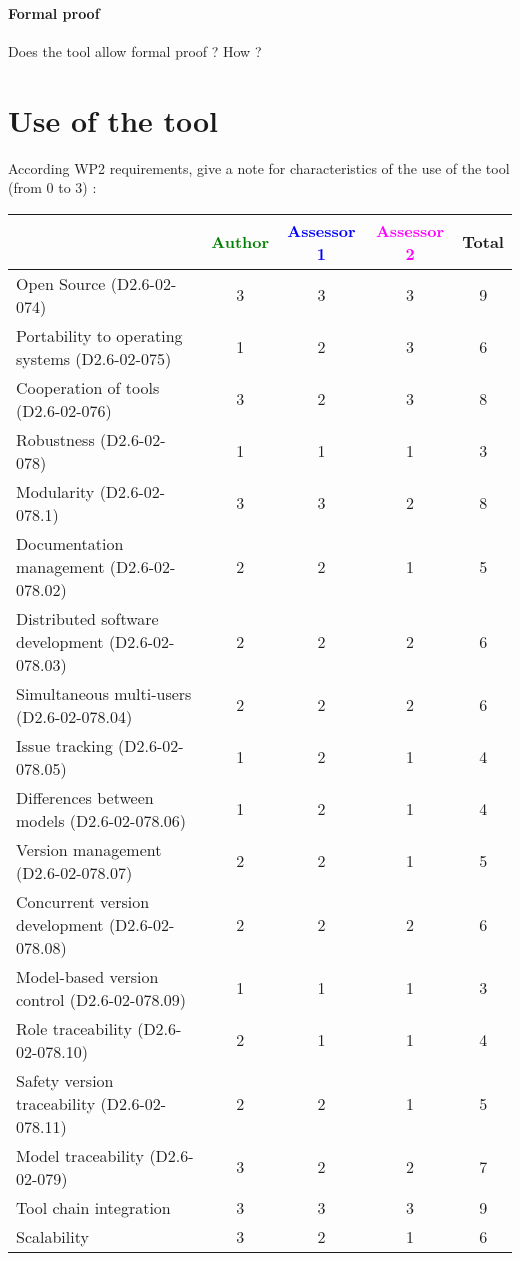 \paragraph{Formal proof}
Does the tool allow formal proof ? How ?

\section{Use of the tool}

According WP2 requirements, give a note for characteristics of the use of the tool (from 0 to 3) :

\begin{tabular}{|l | c | c | c | c|}
\hline
& \textcolor{green}{Author} & \textcolor{blue}{Assessor 1} & \textcolor{magenta}{Assessor 2} & Total \\
\hline
Open Source (D2.6-02-074) & 3 & 3 & 3 & 9 \\
\hline
Portability to operating systems (D2.6-02-075) & 1 & 2 &  3 & 6 \\
\hline
Cooperation of tools (D2.6-02-076) & 3 & 2 & 3 & 8 \\
\hline
Robustness (D2.6-02-078) & 1 & 1 & 1 & 3 \\
\hline
Modularity (D2.6-02-078.1) & 3 & 3 & 2 & 8 \\
\hline
Documentation management (D2.6-02-078.02) & 2 & 2 & 1  & 5 \\
\hline
Distributed software development (D2.6-02-078.03) & 2 & 2 & 2 & 6 \\
\hline
Simultaneous multi-users (D2.6-02-078.04) & 2 & 2 & 2 & 6 \\
\hline
Issue tracking (D2.6-02-078.05) & 1 & 2 & 1 & 4 \\
\hline
Differences between models (D2.6-02-078.06) & 1 & 2 & 1 & 4 \\
\hline
Version management (D2.6-02-078.07) & 2 & 2 & 1 & 5 \\
\hline
Concurrent version development (D2.6-02-078.08) & 2 & 2 & 2 &  6\\
\hline
Model-based version control (D2.6-02-078.09) & 1 & 1 & 1 & 3 \\
\hline
Role traceability (D2.6-02-078.10) & 2 & 1 & 1 & 4 \\
\hline
Safety version traceability (D2.6-02-078.11) & 2 & 2 & 1 & 5 \\
\hline
Model traceability (D2.6-02-079) & 3 & 2 & 2 & 7 \\
\hline
Tool chain integration & 3 & 3 & 3 & 9 \\
\hline
Scalability & 3 & 2 & 1 & 6 \\
\hline
\end{tabular}

